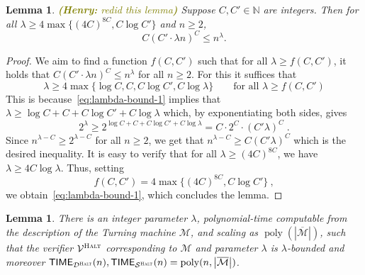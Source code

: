 \documentclass[11pt]{article}
\newtheorem{lemma}[theorem]{Lemma}
\theoremstyle{definition}
\newcommand{\N}{\ensuremath{\mathbb{N}}}
\DeclareMathOperator{\poly}{poly}
\newcommand{\abs}[1]{\left\vert {#1} \right\vert}
\newcommand{\sampler}{\mathcal{S}}
\newcommand{\decider}{\mathcal{D}}
\newcommand{\verifier}{\mathcal{V}}
\newcommand{\halt}{\textsc{Halt}}
\newcommand{\machine}{\cal{M}}
\renewcommand{\cal}[1]{\mathcal{#1}}
\newcommand{\TIME}{\mathsf{TIME}}
\newcommand{\hnote}[1]{\textcolor{olive}{\small {\textbf{(Henry:} #1\textbf{) }}}}
\newcommand{\hnote}[1]{}
\begin{document}
\begin{lemma}
  \label{lem:lambda-bound}
  \hnote{redid this lemma}
  Suppose $C, C' \in \N$ are integers. 
  Then for all $\lambda \ge 4 \max \{ (4C)^{8C}, C \log C' \} $ and $n \ge 2$,
  \begin{equation*}
    C(C' \cdot \lambda n)^C \le n^\lambda.
  \end{equation*}
\end{lemma}

\begin{proof}
We aim to find a function $f(C,C')$ such that for all $\lambda \geq f(C,C')$, it holds that $C(C' \cdot \lambda n)^C \le n^\lambda$ for all $n \geq 2$. For this it suffices that 
\begin{equation}
\label{eq:lambda-bound-1}
	\lambda \geq 4 \max \{ \log C, C, C \log C', C \log \lambda \} \qquad \text{for all $\lambda \geq f(C,C')$}
\end{equation}
This is because~\eqref{eq:lambda-bound-1} implies that $\lambda \geq \log C + C + C\log C' + C\log \lambda$ which, by exponentiating both sides, gives
\[
	2^\lambda \geq 2^{\log C + C + C\log C' + C\log \lambda} = C \cdot 2^C \cdot (C' \lambda)^C\;.
\]
Since $n^{\lambda - C} \geq 2^{\lambda -C}$ for all $n \geq 2$, we get that $n^{\lambda - C} \geq C (C' \lambda)^C$ which is the desired inequality. It is easy to verify that for all $\lambda \geq (4C)^{8C}$, we have $\lambda \geq 4 C \log \lambda$. Thus, setting
\[
	f(C,C') = 4 \max \{ (4C)^{8C}, C \log C' \}~,
\]
we obtain~\eqref{eq:lambda-bound-1}, which concludes the lemma.
\end{proof}

\begin{lemma}
  \label{lem:lambda}
  There is an integer parameter $\lambda$, polynomial-time computable from the
  description of the Turning machine $\cal{M}$, and
  scaling as $\poly(|\overline{\machine}|)$, such that the verifier
  $\verifier^\halt$ corresponding to $\cal{M}$ and parameter $\lambda$ is
  $\lambda$-bounded and moreover $\TIME_{\decider^\halt}(n),\TIME_{\sampler^\halt}(n) = \poly(n, \abs{\overline{\cal{M}}})$.
\end{lemma}
\end{document}
